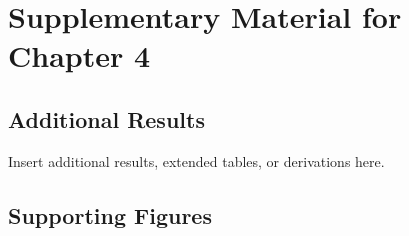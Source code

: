 \chapter{Supplementary Material for Chapter 4}
\label{app:chap4}

\section{Additional Results}
Insert additional results, extended tables, or derivations here.

\section{Supporting Figures}
